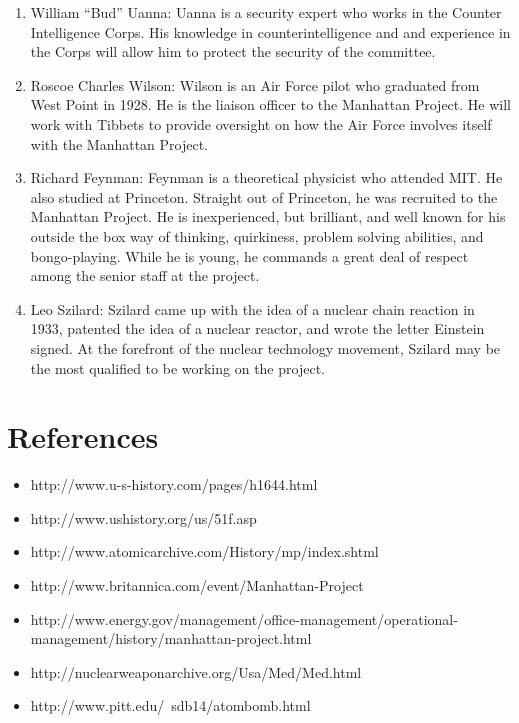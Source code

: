 \documentclass[11 pt, twoside]{article}
\begin{document}
\begin{enumerate}
\item William “Bud” Uanna: Uanna is a security expert who works in the Counter Intelligence Corps. His knowledge in counterintelligence and and experience in the Corps will allow him to protect the security of the committee.
\item Roscoe Charles Wilson: Wilson is an Air Force pilot who graduated from West Point in 1928. He is the liaison officer to the Manhattan Project. He will work with Tibbets to provide oversight on how the Air Force involves itself with the Manhattan Project. 
\item Richard Feynman: Feynman is a theoretical physicist who attended MIT. He also studied at Princeton. Straight out of Princeton, he was recruited to the Manhattan Project. He is inexperienced, but brilliant, and well known for his outside the box way of thinking, quirkiness, problem solving abilities, and bongo-playing. While he is young, he commands a great deal of respect among the senior staff at the project. 
\item Leo Szilard: Szilard came up with the idea of a nuclear chain reaction in 1933, patented the idea of a nuclear reactor, and wrote the letter Einstein signed. At the forefront of the nuclear technology movement, Szilard may be the most qualified to be working on the project.
\end{enumerate}

\section{References}
\begin{itemize}
\item http://www.u-s-history.com/pages/h1644.html 
\item http://www.ushistory.org/us/51f.asp 
\item http://www.atomicarchive.com/History/mp/index.shtml 
\item http://www.britannica.com/event/Manhattan-Project 
\item http://www.energy.gov/management/office-management/operational-management/history/manhattan-project.html
\item http://nuclearweaponarchive.org/Usa/Med/Med.html 
\item http://www.pitt.edu/~sdb14/atombomb.html 
\end{itemize}
\end{document}
